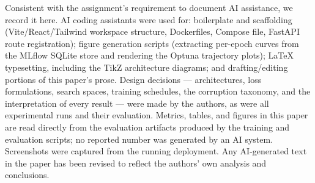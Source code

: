 \documentclass[journal]{IEEEtran}
\begin{document}
Consistent with the assignment's requirement to document AI assistance, we record it here. AI coding assistants were used for: boilerplate and scaffolding (Vite/React/Tailwind workspace structure, Dockerfiles, Compose file, FastAPI route registration); figure generation scripts (extracting per-epoch curves from the MLflow SQLite store and rendering the Optuna trajectory plots); LaTeX typesetting, including the TikZ architecture diagrams; and drafting/editing portions of this paper's prose. Design decisions --- architectures, loss formulations, search spaces, training schedules, the corruption taxonomy, and the interpretation of every result --- were made by the authors, as were all experimental runs and their evaluation. Metrics, tables, and figures in this paper are read directly from the evaluation artifacts produced by the training and evaluation scripts; no reported number was generated by an AI system. Screenshots were captured from the running deployment. Any AI-generated text in the paper has been revised to reflect the authors' own analysis and conclusions.
\end{document}

